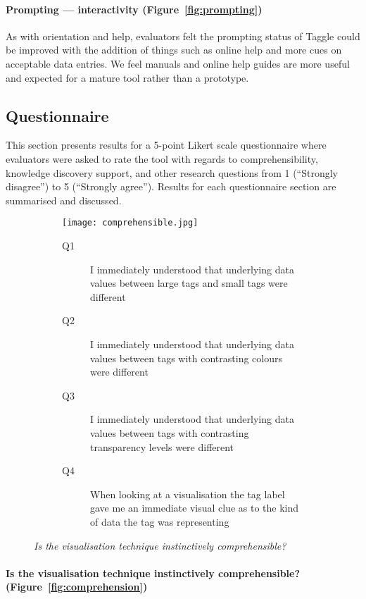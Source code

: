\paragraph{Prompting --- interactivity (Figure~\vref{fig:prompting})}

As with orientation and help, evaluators felt the prompting status of Taggle could be improved with the addition of things such as online help and more cues on acceptable data entries. We feel manuals and online help guides are more useful and expected for a mature tool rather than a prototype.


\subsection{Questionnaire}

This section presents results for a 5-point Likert scale questionnaire where evaluators were asked to rate the tool with regards to comprehensibility, knowledge discovery support, and other research questions from 1 (``Strongly disagree'') to 5 (``Strongly agree''). Results for each questionnaire section are summarised and discussed.

\begin{figure}[!htb]
\centering
\begin{subfigure}{\textwidth}
	\centering
	\texttt{[image: comprehensible.jpg]}
\end{subfigure}
\begin{subfigure}{\textwidth}
  \begin{description}
	\item[Q1]I immediately understood that underlying data values between large tags and small tags were different
	\item[Q2]I immediately understood that underlying data values between tags with contrasting colours were different
	\item[Q3]I immediately understood that underlying data values between tags with contrasting transparency levels were different
	\item[Q4]When looking at a visualisation the tag label gave me an immediate visual clue as to the kind of data the tag was representing
  \end{description}
\end{subfigure}
\caption{\textit{Is the visualisation technique instinctively comprehensible?}}
\label{fig:comprehension}
\end{figure}

\paragraph{Is the visualisation technique instinctively comprehensible? (Figure~\vref{fig:comprehension})}

